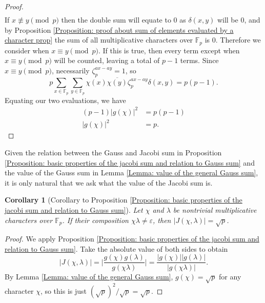 \documentclass[10pt]{amsart}
\newcommand{\eps}{\varepsilon}
\theoremstyle{plain}
\newtheorem{cor}[thm]{Corollary}
\theoremstyle{definition}
\theoremstyle{remark}
\numberwithin{equation}{section}
\begin{document}
\begin{proof}
\begin{align*}
    \end{align*}
    If $x\not\equiv y\pmod{p}$ then the double sum will equate to $0$ as $\delta(x,y)$ will be $0$, and by Proposition \ref{Proposition: proof about sum of elements evaluated by a character prop} the sum of all multiplicative characters over $\mathbb{F}_{p}$ is 0. Therefore we consider when $x\equiv y\pmod{p}$. If this is true, then every term except when $x\equiv y\pmod{p}$ will be counted, leaving a total of $p-1$ terms. Since $x\equiv y\pmod{p}$, necessarily $\zeta_{p}^{ax-ay}=1$, so
    \begin{equation*}
        p\sum_{x\in\mathbb{F}_{p}}\sum_{y\in\mathbb{F}_{p}}\chi(x)\overline{\chi(y)}\zeta_{p}^{ax-ay}\delta(x,y) = p(p-1).
    \end{equation*}
    Equating our two evaluations, we have 
    \begin{align*}
        (p-1)|g(\chi)|^{2} & = p(p-1) \\
        |g(\chi)|^{2} & = p.
    \end{align*}
\end{proof}

Given the relation between the Gauss and Jacobi sum in Proposition \ref{Proposition: basic properties of the jacobi sum and relation to Gauss sum} and the value of the Gauss sum in Lemma \ref{Lemma: value of the general Gauss sum}, it is only natural that we ask what the value of the Jacobi sum is. 

\begin{cor}[Corollary to Proposition \ref{Proposition: basic properties of the jacobi sum and relation to Gauss sum}] \label{Corollary: value of the jacobi sum of two characters}
    Let $\chi$ and $\lambda$ be nontrivial multiplicative characters over $\mathbb{F}_{p}$. If their composition $\chi\lambda\neq\eps$, then $|J(\chi,\lambda)|=\sqrt{p}$. 
\end{cor}
\begin{proof}
    We apply Proposition \ref{Proposition: basic properties of the jacobi sum and relation to Gauss sum}. Take the absolute value of both sides to obtain 
    \begin{equation*}
        |J(\chi,\lambda)| = \bigg| \frac{g(\chi)g(\lambda)}{g(\chi\lambda)} \bigg| =
        \frac{|g(\chi)||g(\lambda)|}{|g(\chi\lambda)|}.
    \end{equation*}
    By Lemma \ref{Lemma: value of the general Gauss sum}, $g(\chi)=\sqrt{p}$ for any character $\chi$, so this is just $(\sqrt{p})^{2}/\sqrt{p}=\sqrt{p}$. 
\end{proof}
\end{document}

